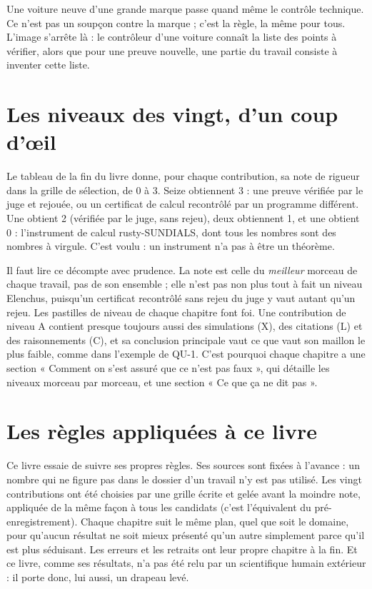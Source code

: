 \begin{analogie}
Une voiture neuve d'une grande marque passe quand même le contrôle technique. Ce n'est pas un soupçon contre la
marque ; c'est la règle, la même pour tous. L'image s'arrête là : le contrôleur d'une voiture connaît la liste des
points à vérifier, alors que pour une preuve nouvelle, une partie du travail consiste à inventer cette liste.
\end{analogie}

\section{Les niveaux des vingt, d'un coup d'œil}

Le tableau de la fin du livre donne, pour chaque contribution, sa note de rigueur dans la grille de sélection, de 0 à
3. Seize obtiennent 3 : une preuve vérifiée par le juge et rejouée, ou un certificat de calcul recontrôlé par un
programme différent. Une obtient 2 (vérifiée par le juge, sans rejeu), deux obtiennent 1, et une obtient 0 :
l'instrument de calcul rusty-SUNDIALS, dont tous les nombres sont des nombres à virgule. C'est voulu : un instrument
n'a pas à être un théorème.

Il faut lire ce décompte avec prudence. La note est celle du \emph{meilleur} morceau de chaque travail, pas de son
ensemble ; elle n'est pas non plus tout à fait un niveau Elenchus, puisqu'un certificat recontrôlé sans rejeu du juge
y vaut autant qu'un rejeu. Les pastilles de niveau de chaque chapitre font foi. Une contribution de niveau A contient presque toujours aussi des simulations (X), des citations (L) et
des raisonnements (C), et sa conclusion principale vaut ce que vaut son maillon le plus faible, comme dans l'exemple
de QU-1. C'est pourquoi chaque chapitre a une section « Comment on s'est assuré que ce n'est pas faux », qui détaille
les niveaux morceau par morceau, et une section « Ce que ça ne dit pas ».

\section{Les règles appliquées à ce livre}

Ce livre essaie de suivre ses propres règles. Ses sources sont fixées à l'avance : un nombre qui ne figure pas dans le
dossier d'un travail n'y est pas utilisé. Les vingt contributions ont été choisies par une grille écrite et gelée avant
la moindre note, appliquée de la même façon à tous les candidats (c'est l'équivalent du pré-enregistrement). Chaque
chapitre suit le même plan, quel que soit le domaine, pour qu'aucun résultat ne soit mieux présenté qu'un autre
simplement parce qu'il est plus séduisant. Les erreurs et les retraits ont leur propre chapitre à la fin. Et ce livre,
comme ses résultats, n'a pas été relu par un scientifique humain extérieur : il porte donc, lui aussi, un drapeau
levé.

